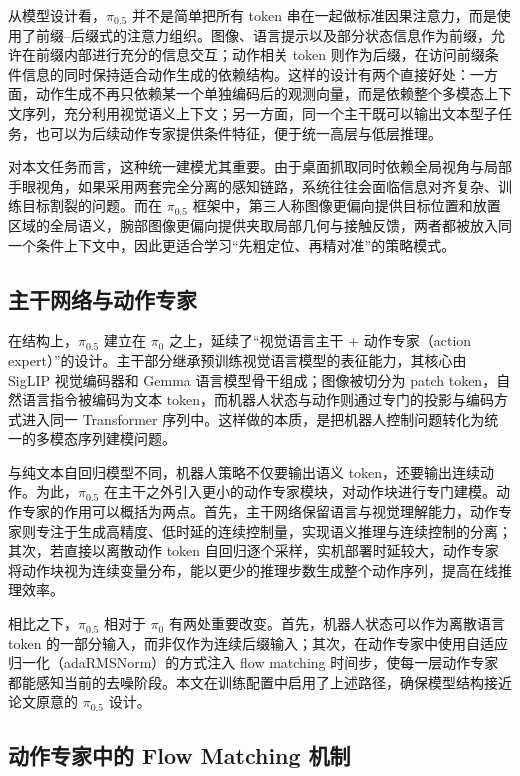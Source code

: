 从模型设计看，$\pi_{0.5}$ 并不是简单把所有 token 串在一起做标准因果注意力，而是使用了前缀--后缀式的注意力组织。图像、语言提示以及部分状态信息作为前缀，允许在前缀内部进行充分的信息交互；动作相关 token 则作为后缀，在访问前缀条件信息的同时保持适合动作生成的依赖结构。这样的设计有两个直接好处：一方面，动作生成不再只依赖某一个单独编码后的观测向量，而是依赖整个多模态上下文序列，充分利用视觉语义上下文；另一方面，同一个主干既可以输出文本型子任务，也可以为后续动作专家提供条件特征，便于统一高层与低层推理。

对本文任务而言，这种统一建模尤其重要。由于桌面抓取同时依赖全局视角与局部手眼视角，如果采用两套完全分离的感知链路，系统往往会面临信息对齐复杂、训练目标割裂的问题。而在 $\pi_{0.5}$ 框架中，第三人称图像更偏向提供目标位置和放置区域的全局语义，腕部图像更偏向提供夹取局部几何与接触反馈，两者都被放入同一个条件上下文中，因此更适合学习“先粗定位、再精对准”的策略模式。

\subsection{主干网络与动作专家}

在结构上，$\pi_{0.5}$ 建立在 $\pi_{0}$\cite{black2024pi0} 之上，延续了“视觉语言主干 + 动作专家（action expert）”的设计。主干部分继承预训练视觉语言模型的表征能力，其核心由 SigLIP 视觉编码器和 Gemma 语言模型骨干组成；图像被切分为 patch token，自然语言指令被编码为文本 token，而机器人状态与动作则通过专门的投影与编码方式进入同一 Transformer 序列中\cite{beyer2024paligemma}。这样做的本质，是把机器人控制问题转化为统一的多模态序列建模问题。

与纯文本自回归模型不同，机器人策略不仅要输出语义 token，还要输出连续动作。为此，$\pi_{0.5}$ 在主干之外引入更小的动作专家模块，对动作块进行专门建模。动作专家的作用可以概括为两点。首先，主干网络保留语言与视觉理解能力，动作专家则专注于生成高精度、低时延的连续控制量，实现语义推理与连续控制的分离；其次，若直接以离散动作 token 自回归逐个采样，实机部署时延较大，动作专家将动作块视为连续变量分布，能以更少的推理步数生成整个动作序列，提高在线推理效率。

相比之下，$\pi_{0.5}$ 相对于 $\pi_{0}$ 有两处重要改变。首先，机器人状态可以作为离散语言 token 的一部分输入，而非仅作为连续后缀输入；其次，在动作专家中使用自适应归一化（adaRMSNorm）的方式注入 flow matching 时间步，使每一层动作专家都能感知当前的去噪阶段。本文在训练配置中启用了上述路径，确保模型结构接近论文原意的 $\pi_{0.5}$ 设计。

\subsection{动作专家中的 Flow Matching 机制}

